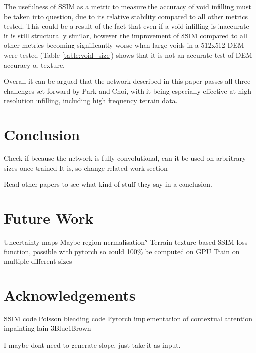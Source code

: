 \documentclass[twocolumn]{article}
\begin{document}
The usefulness of SSIM as a metric to measure the accuracy of void infilling must be taken into question, due to its relative stability compared to all other metrics tested.
This could be a result of the fact that even if a void infilling is inaccurate it is still structurally similar, however the improvement of SSIM compared to all other metrics becoming significantly worse when large voids in a 512x512 DEM were tested (Table \ref{table:void_size}) shows that it is not an accurate test of DEM accuracy or texture.

Overall it can be argued that the network described in this paper passes all three challenges set forward by Park and Choi, with it being especially effective at high resolution infilling, including high frequency terrain data.

\section{Conclusion}
\label{sec:org1883e14}
Check if because the network is fully convolutional, can it be used on arbritrary sizes once trained
It is, so change related work section

Read other papers to see what kind of stuff they say in a conclusion.


\section{Future Work}
\label{sec:org59d7152}

Uncertainty maps
Maybe region normalisation?\autocite{yuRegionNormalizationImage2023}
Terrain texture based SSIM loss function, possible with pytorch so could 100\% be computed on GPU
Train on multiple different sizes

\section*{Acknowledgements}

SSIM code
Poisson blending code
Pytorch implementation of contextual attention inpainting
Iain
3Blue1Brown

I maybe dont need to generate slope, just take it as input.
\printbibliography
\end{document}
